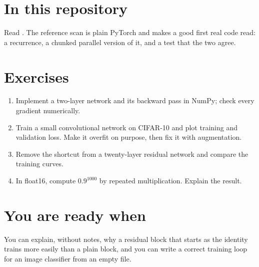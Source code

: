 \section{In this repository}

Read . The reference scan is plain PyTorch and makes a good first real
code read: a recurrence, a chunked parallel version of it, and a test that the two agree.

\section{Exercises}

\begin{enumerate}
  \item Implement a two-layer network and its backward pass in NumPy; check every gradient numerically.
  \item Train a small convolutional network on CIFAR-10 and plot training and validation loss. Make it overfit
        on purpose, then fix it with augmentation.
  \item Remove the shortcut from a twenty-layer residual network and compare the training curves.
  \item In float16, compute $0.9^{1000}$ by repeated multiplication. Explain the result.
\end{enumerate}

\section{You are ready when}

You can explain, without notes, why a residual block that starts as the identity trains more easily than a
plain block, and you can write a correct training loop for an image classifier from an empty file.
